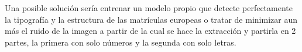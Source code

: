 Una posible solución sería entrenar un modelo propio que detecte perfectamente la tipografía y la estructura de las matrículas europeas o tratar de minimizar aun más el ruido de la imagen a partir de la cual se hace la extracción y partirla en 2 partes, la primera con solo números y la segunda con solo letras.